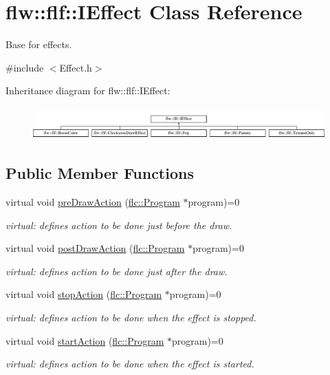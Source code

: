 \hypertarget{classflw_1_1flf_1_1IEffect}{}\section{flw\+:\+:flf\+:\+:I\+Effect Class Reference}
\label{classflw_1_1flf_1_1IEffect}


Base for effects.  




{\ttfamily \#include $<$Effect.\+h$>$}

Inheritance diagram for flw\+:\+:flf\+:\+:I\+Effect\+:\begin{figure}[H]
\begin{center}
\leavevmode
\includegraphics[height=1.251397cm]{classflw_1_1flf_1_1IEffect}
\end{center}
\end{figure}
\subsection*{Public Member Functions}
\begin{DoxyCompactItemize}
\item 
virtual void \hyperlink{classflw_1_1flf_1_1IEffect_ae65eed21e40a226c7739d3c5dedd9e50}{pre\+Draw\+Action} (\hyperlink{classflw_1_1flc_1_1Program}{flc\+::\+Program} $\ast$program)=0
\begin{DoxyCompactList}\small\item\em virtual\+: defines action to be done just before the draw. \end{DoxyCompactList}\item 
virtual void \hyperlink{classflw_1_1flf_1_1IEffect_a6bb11d90e7e4da057ca398bd8c61208a}{post\+Draw\+Action} (\hyperlink{classflw_1_1flc_1_1Program}{flc\+::\+Program} $\ast$program)=0
\begin{DoxyCompactList}\small\item\em virtual\+: defines action to be done just after the draw. \end{DoxyCompactList}\item 
virtual void \hyperlink{classflw_1_1flf_1_1IEffect_a1a03eaf63a9d4edbd8764540d2d4133c}{stop\+Action} (\hyperlink{classflw_1_1flc_1_1Program}{flc\+::\+Program} $\ast$program)=0
\begin{DoxyCompactList}\small\item\em virtual\+: defines action to be done when the effect is stopped. \end{DoxyCompactList}\item 
virtual void \hyperlink{classflw_1_1flf_1_1IEffect_afc7cec9080d135ed264b08a90c7b94e9}{start\+Action} (\hyperlink{classflw_1_1flc_1_1Program}{flc\+::\+Program} $\ast$program)=0
\begin{DoxyCompactList}\small\item\em virtual\+: defines action to be done when the effect is started. \end{DoxyCompactList}\end{DoxyCompactItemize}


